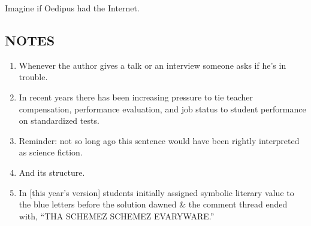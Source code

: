Imagine if Oedipus had the Internet.

\subsection{NOTES}

\begin{enumerate}
\item
  Whenever the author gives a talk or an interview someone asks if he's
  in trouble.
\item
  In recent years there has been increasing pressure to tie teacher
  compensation, performance evaluation, and job status to student
  performance on standardized tests.
\item
  Reminder: not so long ago this sentence would have been rightly
  interpreted as science fiction.
\item
  And its structure.
\item
  In {[}this year's version{]} students initially assigned symbolic
  literary value to the blue letters before the solution dawned \& the
  comment thread ended with, ``THA SCHEMEZ SCHEMEZ EVARYWARE.''
\end{enumerate}
